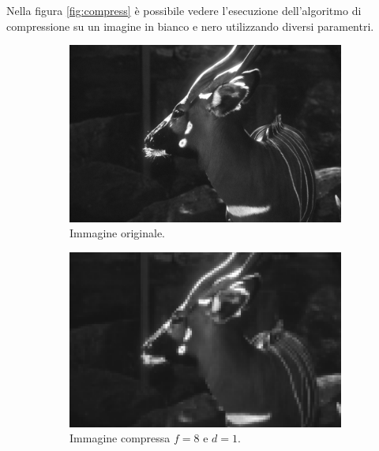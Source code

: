 Nella figura \ref{fig:compress} è possibile vedere l'esecuzione dell'algoritmo di
compressione su un imagine in bianco e nero utilizzando diversi paramentri.

\begin{figure}[!ht]
    \centering
    \begin{subfigure}[!ht]{0.45\textwidth}
        \includegraphics[width=\textwidth]{Progetto_2/img/gui.png}
        \caption{Immagine originale.}
    \end{subfigure}
    \begin{subfigure}[!ht]{0.45\textwidth}
        \includegraphics[width=\textwidth]{Progetto_2/img/gui_compressed1.png}
        \caption{Immagine compressa $f = 8$ e $d = 1$.}
    \end{subfigure}
    \begin{subfigure}[!ht]{0.45\textwidth}

\end{subfigure}
\end{figure}
